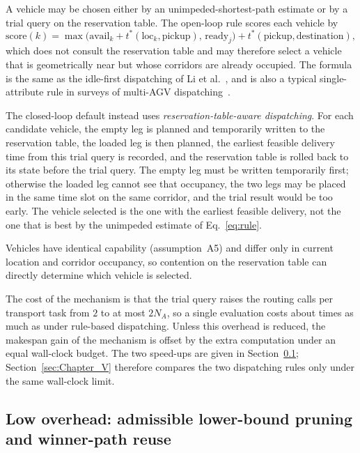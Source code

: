 A vehicle may be chosen either by an unimpeded-shortest-path estimate or by a trial query on the reservation table. The open-loop rule scores each vehicle by
\begin{equation}
\label{eq:rule}
\mathrm{score}(k)=\max\bigl(\mathrm{avail}_k+t^{*}(\mathrm{loc}_k,\text{pickup}),\,
\mathrm{ready}_j\bigr)+t^{*}(\text{pickup},\text{destination}),
\end{equation}
which does not consult the reservation table and may therefore select a vehicle that is geometrically near but whose corridors are already occupied.
The formula is the same as the idle-first dispatching of Li et al.~\cite{li2026framework}, and is also a typical single-attribute rule in surveys of multi-AGV dispatching~\cite{lu2022agv}.

The closed-loop default instead uses \emph{reservation-table-aware dispatching}. For each candidate vehicle, the empty leg is planned and temporarily written to the reservation table, the loaded leg is then planned, the earliest feasible delivery time from this trial query is recorded, and the reservation table is rolled back to its state before the trial query.
The empty leg must be written temporarily first; otherwise the loaded leg cannot see that occupancy, the two legs may be placed in the same time slot on the same corridor, and the trial result would be too early.
The vehicle selected is the one with the earliest feasible delivery, not the one that is best by the unimpeded estimate of Eq.~\eqref{eq:rule}.

Vehicles have identical capability (assumption~A5) and differ only in current location and corridor occupancy, so contention on the reservation table can directly determine which vehicle is selected.

The cost of the mechanism is that the trial query raises the routing calls per transport task from $2$ to at most $2N_A$, so a single evaluation costs about \CostMultBefore{} times as much as under rule-based dispatching.
Unless this overhead is reduced, the makespan gain of the mechanism is offset by the extra computation under an equal wall-clock budget.
The two speed-ups are given in Section~\ref{sec:speedup}; Section~\ref{sec:Chapter_V} therefore compares the two dispatching rules only under the same wall-clock limit.

\subsection{Low overhead: admissible lower-bound pruning and winner-path reuse}
\label{sec:speedup}

